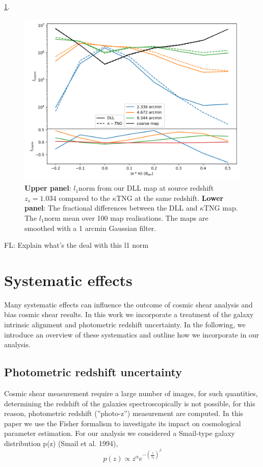 \documentclass[twocolumn,twocolappendix]{aastex63}
\newcommand{\EiffL}[1]{{\color{cyan}FL: #1}}
\begin{document}
\ref{fig:l1normktng_comp1arc}.
\begin{figure}
    \centering
    \includegraphics[width=\columnwidth]{paper/figures/l1normktng_comp1arc.png}
    \caption{
      \textbf{Upper panel}: $l_1$norm from our DLL map at source redshift $z_s=1.034$ compared to the $\kappa$TNG at the same redshift. \textbf{Lower panel}: The fractional differences between the DLL and $\kappa$TNG map.
 The $l_1$norm mean over 100 map realisations. The maps are smoothed with a 1 arcmin Gaussian filter. }
    \label{fig:l1normktng_comp1arc}
\end{figure}


\EiffL{Explain what's the deal with this l1 norm}

\section{Systematic effects}
Many systematic effects can influence the outcome of cosmic shear analysis and bias cosmic shear results. 
In this work we incorporate a treatment of the galaxy intrinsic alignment and photometric redshift uncertainty.
In the following, we introduce an overview of these systematics and outline how we incorporate in our analysis.

\subsection{Photometric redshift uncertainty}
Cosmic shear measurement require a large number of images, for such quantities, determining the redshift of the galaxies spectroscopically is not possible, for this reason, photometric redshift (''photo-z'') measurement are computed.
In this paper we use the Fisher formalism to investigate its impact on cosmological parameter estimation.
For our analysis we considered a Smail-type galaxy distribution p(z) (Smail et al. 1994),
\begin{equation}\label{photz}
    p(z) \propto z^{\alpha} e^{-(\frac{z}{z_0})^{\beta}}
\end{equation}
\end{document}
